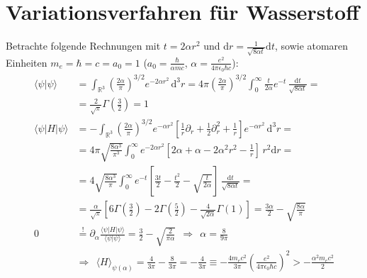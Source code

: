 \documentclass[a4paper,12pt]{article}
\newcommand{\bra}{}
\newcommand{\brak}{}
\newcommand{\braket}{}
\newcommand{\intx}{}
\newcommand{\intr}{}
\newcommand{\kla}{}
\newcommand{\klam}{}
\newcommand{\tecxt}{}
\begin{document}
\section{Variationsverfahren für Wasserstoff}
Betrachte folgende Rechnungen mit $t=2\alpha r^2$ und d$r = \frac{1}{\sqrt{8\alpha t}}\tecxt\text{d}t$, sowie atomaren Einheiten $m_e=\hbar=c=a_0=1$ ($a_0=\frac{\hbar}{\alpha mc}$, $\alpha=\frac{e^2}{4\pi\epsilon_0\hbar c}$):
\begin{align*}
\brak\langle {\psi}| {\psi}\rangle&=\intr\int_{\mathbb{R}^{3}}{\kla\left( {\frac{2\alpha}{\pi}} \right)^{3/2}e^{-2\alpha r^2}}\,\mathrm{d}^{3}r=4\pi\kla\left( {\frac{2\alpha}{\pi}} \right)^{3/2}\intx\int_{0}^{\infty}\frac{t}{2\alpha}e^{-t}\,\frac{\mathrm{d}t}{\sqrt{8\alpha t}}= \\
&=\frac{2}{\sqrt{\pi}}\Gamma\kla\left( {\frac{3}{2}} \right)=1 \\
\braket\langle {\psi} | {H} | {\psi}\rangle&=-\intr\int_{\mathbb{R}^{3}}{\kla\left( {\frac{2\alpha}{\pi}} \right)^{3/2}e^{-\alpha r^2}\klam\left[ {\frac{1}{r}\partial_r + \frac{1}{2}\partial_r^2 + \frac{1}{r}} \right]e^{-\alpha r^2}}\,\mathrm{d}^{3}r=\\
&=4\pi\sqrt{\frac{8\alpha^3}{\pi^3}}\intx\int_{0}^{\infty}e^{-2\alpha r^2}\klam\left[ {2\alpha + \alpha-2\alpha^2r^2-\frac{1}{r}} \right]\,r^2\mathrm{d}r= \\
&=4\sqrt{\frac{8\alpha^3}{\pi}}\intx\int_{0}^{\infty}e^{-t}\klam\left[ {\frac{3t}{2}-\frac{t^2}{2}-\sqrt{\frac{t}{2\alpha}}} \right]\,\frac{\mathrm{d}t}{\sqrt{8\alpha t}}= \\
&=\frac{\alpha}{\sqrt{\pi}}\klam\left[ {6\Gamma\kla\left( {\frac{3}{2}} \right)-2\Gamma\kla\left( {\frac{5}{2}} \right)-\frac{4}{\sqrt{2\alpha}}\Gamma(1)} \right]=\frac{3\alpha}{2}-\sqrt{\frac{8\alpha}{\pi}} \\
0&\overset{!}{=}\partial_\alpha\frac{\braket\langle {\psi} | {H} | {\psi}\rangle}{\brak\langle {\psi}| {\psi}\rangle}=\frac{3}{2}-\sqrt{\frac{2}{\pi\alpha}}\ \ \Rightarrow\ \ \alpha = \frac{8}{9\pi}\\
&\Rightarrow\ \ \bra\langle {H}\rangle_{\psi(\alpha)}=\frac{4}{3\pi}-\frac{8}{3\pi}=-\frac{4}{3\pi}\equiv-\frac{4m_ec^2}{3\pi}\kla\left( {\frac{e^2}{4\pi\epsilon_0\hbar c}} \right)^2>-\frac{\alpha^2m_ec^2}{2}
\end{align*}
\end{document}
